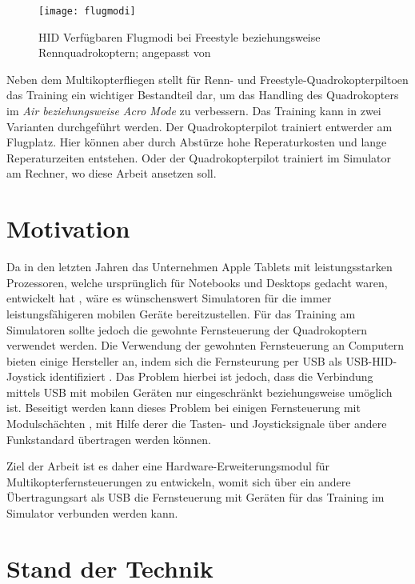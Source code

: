 \begin{figure}[h]
    \centering
    \texttt{[image: flugmodi]}
    \caption{\acs{HID} Verfügbaren Flugmodi bei Freestyle beziehungsweise Rennquadrokoptern; angepasst von \cite{betafpvFlugmodi}}
    \label{fig:flugmodi}
\end{figure}

Neben dem Multikopterfliegen stellt für Renn- und Freestyle-Quadrokopterpiltoen das Training ein wichtiger Bestandteil dar, um das Handling des Quadrokopters im \textit{Air beziehungsweise Acro Mode} zu verbessern. Das Training kann in zwei Varianten durchgeführt werden. Der Quadrokopterpilot trainiert entwerder am Flugplatz. Hier können aber durch Abstürze hohe Reperaturkosten und lange Reperaturzeiten entstehen. Oder der Quadrokopterpilot trainiert im Simulator am Rechner, wo diese Arbeit ansetzen soll.

\section{Motivation}

Da in den letzten Jahren das Unternehmen Apple Tablets mit leistungsstarken Prozessoren, welche ursprünglich für Notebooks und Desktops gedacht waren, entwickelt hat \cite{appleM2IPad}, wäre es wünschenswert Simulatoren für die immer leistungsfähigeren mobilen Geräte bereitzustellen. Für das Training am Simulatoren sollte jedoch die gewohnte Fernsteuerung der Quadrokoptern verwendet werden. Die Verwendung der gewohnten Fernsteuerung an Computern bieten einige Hersteller an, indem sich die Fernsteurung per USB als USB-\acs{HID}-Joystick identifiziert \cite{opentxJoystick}. Das Problem hierbei ist jedoch, dass die Verbindung mittels USB mit mobilen Geräten nur eingeschränkt beziehungsweise umöglich ist. Beseitigt werden kann dieses Problem bei einigen Fernsteuerung mit Modulschächten \cite{opentxModulbay}, mit Hilfe derer die Tasten- und Joysticksignale über andere Funkstandard übertragen werden können.

Ziel der Arbeit ist es daher eine Hardware-Erweiterungsmodul für Multikopterfernsteuerungen zu entwickeln, womit sich über ein andere Übertragungsart als USB die Fernsteuerung mit Geräten für das Training im Simulator verbunden werden kann.

\section{Stand der Technik}

